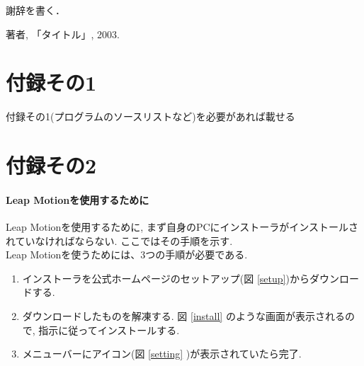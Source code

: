 \documentclass{funthesis}
\begin{document}
謝辞を書く．


\begin{thebibliography}{9}
  著者, 「タイトル」, 2003.
\end{thebibliography}


\appendix

\chapter*{付録その1} %

付録その1(プログラムのソースリストなど)を必要があれば載せる

\chapter*{付録その2}
\subsubsection{Leap Motionを使用するために}
Leap Motionを使用するために, まず自身のPCにインストーラがインストールされていなければならない. ここではその手順を示す.\\



Leap Motionを使うためには、3つの手順が必要である. 
\begin{enumerate}
 \item インストーラを公式ホームページのセットアップ(図 \ref{setup})からダウンロードする.
 \item ダウンロードしたものを解凍する. 図 \ref{install} のような画面が表示されるので, 指示に従ってインストールする. 
 \item メニューバーにアイコン(図 \ref{setting} )が表示されていたら完了. 
\end{enumerate}
\end{document}

